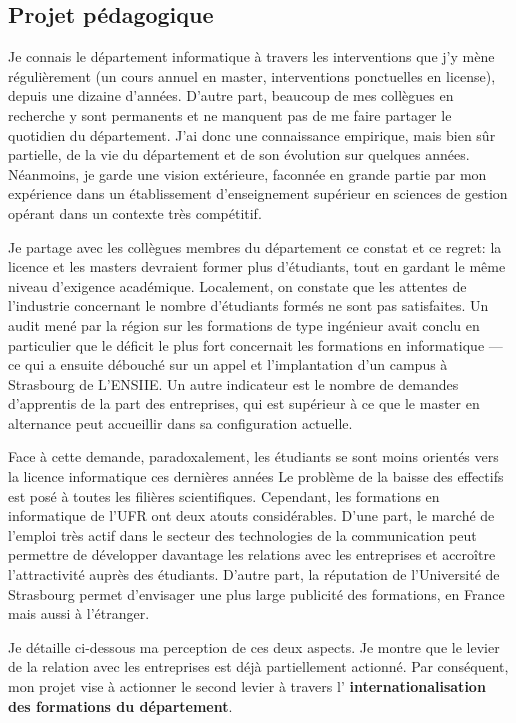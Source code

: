 \documentclass[11pt]{article}
\begin{document}
\subsection{Projet pédagogique}

Je connais le département informatique à travers les interventions que j'y mène
régulièrement (un cours annuel en master, interventions ponctuelles en license), 
depuis une dizaine d'années. D'autre part, beaucoup de mes collègues en recherche 
y sont permanents et ne manquent pas de me faire partager le quotidien du 
département. J'ai donc une connaissance empirique, mais bien sûr partielle, de 
la vie du département et de son évolution sur quelques années. Néanmoins, je 
garde une vision extérieure, faconnée en grande partie par mon expérience 
dans un établissement d'enseignement supérieur en sciences de gestion opérant 
dans un contexte très compétitif.

Je partage avec les collègues membres du département ce constat et ce regret: 
la licence et les masters devraient former plus d'étudiants, tout en gardant le 
même niveau d'exigence académique. Localement, on constate que les attentes de 
l'industrie concernant le nombre d'étudiants formés ne sont pas satisfaites. 
Un audit mené par la région sur les formations de type ingénieur avait conclu 
en particulier que le déficit le plus fort concernait les formations en 
informatique --- ce qui a ensuite débouché sur un appel et l'implantation
d'un campus à Strasbourg de L'ENSIIE. Un autre indicateur est le nombre de
demandes d'apprentis de la part des entreprises, qui est supérieur à ce que
le master en alternance peut accueillir dans sa configuration actuelle.

Face à cette demande, paradoxalement, les étudiants se sont moins orientés 
vers la licence informatique ces dernières années  Le problème de la baisse des 
effectifs est posé à toutes les filières scientifiques. Cependant, les 
formations en informatique de l'UFR ont deux atouts considérables. D'une part, 
le marché de l'emploi très actif dans le secteur des technologies de la 
communication peut permettre de développer davantage les relations avec les 
entreprises et accroître l'attractivité auprès des étudiants. D'autre part, 
la réputation de l'Université de Strasbourg permet d'envisager une 
plus large publicité des formations, en France mais aussi à l'étranger.

Je détaille ci-dessous ma perception de ces deux aspects. Je montre que le
levier de la relation avec les entreprises est déjà partiellement actionné.
Par conséquent, mon projet vise à actionner le second levier à travers l'%
\textbf{internationalisation des formations du département}.
\end{document}

